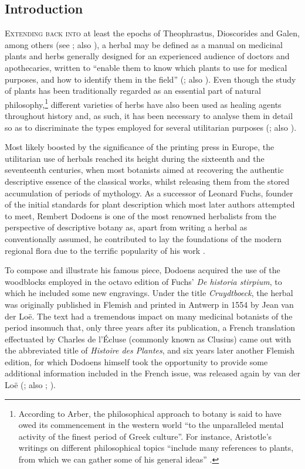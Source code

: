 \begin{paper}
\section{Introduction} 
\textsc{Extending back into} at least the epochs of Theophrastus, Dioscorides and
Galen, among others (see \cite[xxxvii-xliii]{hunt_plant_1989}; also \cite{moreno_olalla_lelamour_2018}), a herbal may be defined as a manual on medicinal plants and herbs
generally designed for an experienced audience of doctors and
apothecaries, written to ``enable them to know which plants to use for
medical purposes, and how to identify them in the field'' (\cite[24]{elliott_world_2011}; also \cite{britannica_herbal_2012}). Even though the study of plants has
been traditionally regarded as an essential part of natural
philosophy,\footnote{According to Arber, the philosophical approach to
  botany is said to have owed its commencement in the western world ``to
  the unparalleled mental activity of the finest period of Greek
  culture''. For instance, Aristotle's writings on different
  philosophical topics ``include many references to plants, from which
  we can gather some of his general ideas'' \citep[1--2]{arber_herbals_1953}.} different
varieties of herbs have also been used as healing agents throughout history and, as such, it has been necessary to analyse them in detail so
as to discriminate the types employed for several utilitarian purposes
(\cite[1--6]{arber_herbals_1953}; also \cite[19--21]{neville_early_2022}).

Most likely boosted by the significance of the printing press in Europe,
the utilitarian use of herbals reached its height during the sixteenth
and the seventeenth centuries, when most botanists aimed at recovering
the authentic descriptive essence of the classical works, whilst
releasing them from the stored accumulation of periods of mythology. As
a successor of Leonard Fuchs, founder of the initial standards for plant
description which most later authors attempted to meet, Rembert Dodoens
is one of the most renowned herbalists from the perspective of
descriptive botany as, apart from writing a herbal as conventionally
assumed, he contributed to lay the foundations of the modern regional
flora due to the terrific popularity of his work \citep[24--26]{elliott_world_2011}.

To compose and illustrate his famous piece, Dodoens acquired the use of
the woodblocks employed in the octavo edition of Fuchs' \emph{De
historia stirpium}, to which he included some new engravings. Under the
title \emph{Cruydtboeck}, the herbal was originally published in Flemish
and printed in Antwerp in 1554 by Jean van der Loë. The text had a
tremendous impact on many medicinal botanists of the period insomuch
that, only three years after its publication, a French translation
effectuated by Charles de l'Écluse (commonly known as Clusius) came out
with the abbreviated title of \emph{Histoire des Plantes}, and six years
later another Flemish edition, for which Dodoens himself took the
opportunity to provide some additional information included in the
French issue, was released again by van der Loë (\cite[82]{arber_herbals_1953}; also \cite{barlow_old_1913}; \cite{elliott_world_2011}).


\end{paper}

